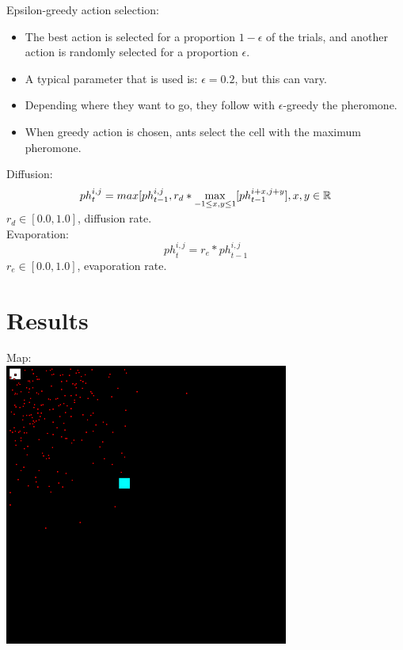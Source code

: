 \documentclass{beamer}
\begin{document}
\begin{frame}
Epsilon-greedy action selection:
\begin{itemize}
\item The best action is selected for a proportion $1 - \epsilon$ of the trials, and another action is randomly selected for a proportion $\epsilon$.
\item A typical parameter that is used is: $\epsilon = 0.2$, but this can vary.
\item Depending where they want to go, they follow with $\epsilon$-greedy the  pheromone.
\item When greedy action is chosen, ants select the cell with the maximum pheromone.
\end{itemize}
\end{frame}

\begin{frame}
Diffusion:
\begin{equation}
{ph}_t^{i,j} = max[{ph}_{t-1}^{i,j}, r_d * \smash{\displaystyle\max_{-1 \leq x,y \leq 1}}[{ph}_{t-1}^{i+x,j+y}], x,y \in \mathbb{R}
\end{equation}
$r_d \in [0.0,1.0]$, diffusion rate.\\
\vspace{0.6cm}
Evaporation:
\begin{equation}
{ph}_t^{i,j} = r_e * {ph}_{t-1}^{i,j}
\end{equation}
$r_e \in [0.0,1.0]$, evaporation rate.\\
\end{frame}

\section{Results}
\begin{frame}
Map:\\
\includegraphics[width=0.7\textwidth]{map.png}
\end{frame}
\end{document}
